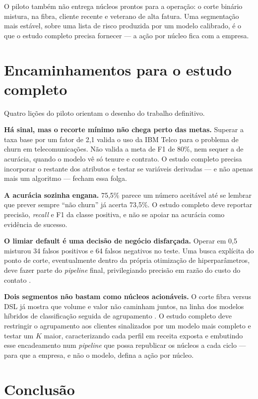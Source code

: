 \documentclass[12pt]{article}
\begin{document}
O piloto também não entrega núcleos prontos para a operação: o corte
binário mistura, na fibra, cliente recente e veterano de alta fatura. Uma
segmentação mais estável, sobre uma lista de risco produzida por um modelo
calibrado, é o que o estudo completo precisa fornecer --- a ação por núcleo
fica com a empresa.

\section{Encaminhamentos para o estudo completo}
\label{sec:5}

Quatro lições do piloto orientam o desenho do trabalho definitivo.

\textbf{Há sinal, mas o recorte mínimo não chega perto das metas.} Superar a
taxa base por um fator de 2,1 valida o uso da IBM Telco para o problema
de churn em telecomunicações. Não valida a meta de F1 de 80\%, nem sequer a de acurácia,
quando o modelo vê só tenure e contrato. O estudo completo precisa incorporar
o restante dos atributos e testar se variáveis derivadas --- e não apenas
mais um algoritmo --- fecham essa folga.

\textbf{A acurácia sozinha engana.} 75,5\% parece um número aceitável até se
lembrar que prever sempre ``não churn'' já acerta 73,5\%. O estudo completo
deve reportar precisão, \textit{recall} e F1 da classe positiva, e não se
apoiar na acurácia como evidência de sucesso.

\textbf{O limiar default é uma decisão de negócio disfarçada.} Operar em
0,5 misturou 34 falsos positivos e 64 falsos negativos no teste. Uma busca
explícita do ponto de corte, eventualmente dentro da própria otimização de
hiperparâmetros, deve fazer parte do \textit{pipeline} final, privilegiando
precisão em razão do custo do contato \cite{verbeke2012}.

\textbf{Dois segmentos não bastam como núcleos acionáveis.} O corte
fibra versus DSL já mostra que volume e valor não caminham juntos, na linha
dos modelos híbridos de classificação seguida de agrupamento
\cite{ullah2019}. O estudo completo deve restringir o agrupamento aos
clientes sinalizados por um modelo mais completo e testar um $K$ maior,
caracterizando cada perfil em receita exposta e embutindo esse encadeamento
num \textit{pipeline} que possa republicar os núcleos a cada ciclo --- para
que a empresa, e não o modelo, defina a ação por núcleo.

\section{Conclusão}
\label{sec:6}
\end{document}

